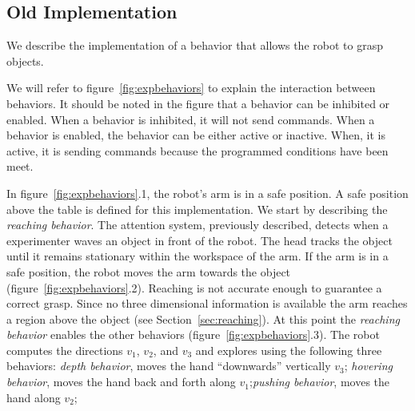 \subsection{Old Implementation}


We describe the implementation of a behavior that allows the robot
to grasp objects.

We will refer to figure~\ref{fig:expbehaviors} to explain the
interaction between behaviors. It should be noted in the figure
that a behavior can be inhibited or enabled. When a behavior is
inhibited, it will not send commands. When a behavior is enabled,
the behavior can be either active or inactive. When, it is active,
it is sending commands because the programmed conditions have been
meet.

In figure~\ref{fig:expbehaviors}.1, the robot's arm is in a safe
position. A safe position above the table is defined for this
implementation. We start by describing the \emph{reaching
behavior}. The attention system, previously described, detects
when a experimenter waves an object in front of the robot. The
head tracks the object until it remains stationary within the
workspace of the arm. If the arm is in a safe position, the robot
moves the arm towards the object
(figure~\ref{fig:expbehaviors}.2). Reaching is not accurate enough
to guarantee a correct grasp. Since no three dimensional
information is available the arm reaches a region above the object
(see Section~\ref{sec:reaching}). At this point the \emph{reaching
behavior} enables the other behaviors
(figure~\ref{fig:expbehaviors}.3). The robot computes the
directions $v_1$, $v_2$, and $v_3$ and explores using the
following three behaviors: \emph{depth behavior}, moves the hand
``downwards'' vertically $v_3$; \emph{hovering behavior}, moves
the hand back and forth along $v_1$;\emph{pushing behavior}, moves
the hand along $v_2$;


